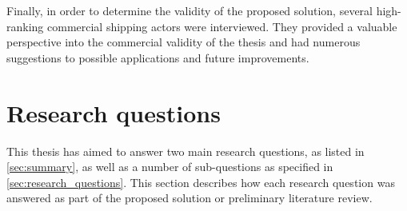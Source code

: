 Finally, in order to determine the validity of the proposed solution, several high-ranking commercial shipping actors were interviewed. They provided a valuable perspective into the commercial validity of the thesis and had numerous suggestions to possible applications and future improvements.



\section{Research questions}

This thesis has aimed to answer two main research questions, as listed in \cref{sec:summary}, as well as a number of sub-questions as specified in \cref{sec:research_questions}. This section describes how each research question was answered as part of the proposed solution or preliminary literature review.

